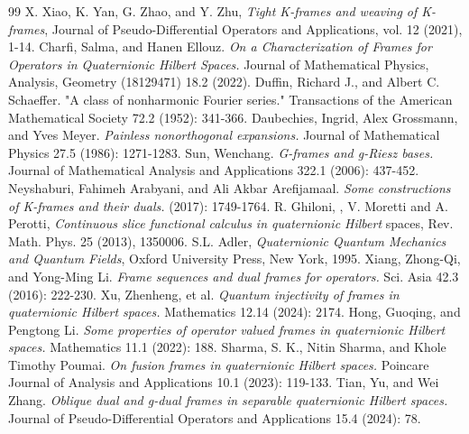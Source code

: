 \documentclass[a4paper,12pt,reqno]{amsart}
\theoremstyle{plain}
\theoremstyle{remark}
\begin{document}
\begin{thebibliography}{99}
		 X. Xiao, K. Yan, G. Zhao, and Y. Zhu, \emph{Tight K-frames and weaving of K-frames}, Journal
		of Pseudo-Differential Operators and Applications, vol. 12 (2021), 1-14.
		  Charfi, Salma, and Hanen Ellouz. \emph{On a Characterization of Frames for Operators in Quaternionic Hilbert Spaces.} Journal of Mathematical Physics, Analysis, Geometry (18129471) 18.2 (2022).
		 Duffin, Richard J., and Albert C. Schaeffer. "A class of nonharmonic Fourier series." Transactions of the American Mathematical Society 72.2 (1952): 341-366.
		  Daubechies, Ingrid, Alex Grossmann, and Yves Meyer. \emph{Painless nonorthogonal expansions.} Journal of Mathematical Physics 27.5 (1986): 1271-1283.
		 Sun, Wenchang. \emph{G-frames and g-Riesz bases.} Journal of Mathematical Analysis and Applications 322.1 (2006): 437-452.
		  Neyshaburi, Fahimeh Arabyani, and Ali Akbar Arefijamaal. \emph{Some constructions of K-frames and their duals.} (2017): 1749-1764.
		  R. Ghiloni, , V. Moretti and A. Perotti, \emph{Continuous slice functional calculus in quaternionic Hilbert}
		spaces, Rev. Math. Phys. 25 (2013), 1350006.
		 S.L. Adler, \emph{Quaternionic Quantum Mechanics and Quantum Fields}, Oxford University Press, New
		York, 1995.
		 Xiang, Zhong-Qi, and Yong-Ming Li. \emph{Frame sequences and dual frames for operators.} Sci. Asia 42.3 (2016): 222-230.
		 Xu, Zhenheng, et al. \emph{Quantum injectivity of frames in quaternionic Hilbert spaces.} Mathematics 12.14 (2024): 2174.
		 Hong, Guoqing, and Pengtong Li. \emph{Some properties of operator valued frames in quaternionic Hilbert spaces.} Mathematics 11.1 (2022): 188.
		 Sharma, S. K., Nitin Sharma, and Khole Timothy Poumai. \emph{On fusion frames in quaternionic Hilbert spaces.} Poincare Journal of Analysis and Applications 10.1 (2023): 119-133.
		 Tian, Yu, and Wei Zhang. \emph{Oblique dual and g-dual frames in separable quaternionic Hilbert spaces.} Journal of Pseudo-Differential Operators and Applications 15.4 (2024): 78.
		
	\end{thebibliography}
	
	
	
	
	
	
	
\end{document}
